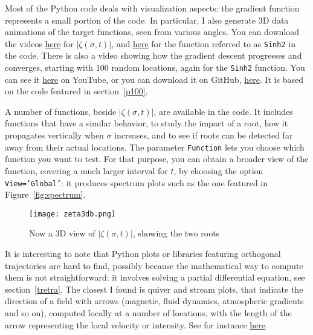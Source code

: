 \documentclass[oneside,10pt]{book}
\begin{document}
Most of the Python code deals with visualization aspects: the gradient function represents a small portion of the code. In particular, I also generate 3D data animations of the target functions, seen from various angles. You can download the videos 
\href{https://github.com/VincentGranville/Experimental-Math-Number-Theory/blob/main/Images/gradient_3D_rotate_zeta.mp4}{here} for $|\zeta(\sigma,t)|$, and \href{https://github.com/VincentGranville/Experimental-Math-Number-Theory/blob/main/Images/gradient_3D_Rotate.mp4}{here} for the function referred to as \texttt{Sinh2} in the code. There is also a video showing how the gradient descent progresses and converges, 
 starting with 100 random locations, again for the \texttt{Sinh2} function. You can see it \href{https://www.youtube.com/watch?v=pqQsLpPkvbw}{here} on YouTube, or you can download it on GitHub, \href{https://github.com/VincentGranville/Experimental-Math-Number-Theory/blob/main/Images/RH4_ortho.mp4}{here}. It is based on the code featured in section~\ref{p100}.

A number of functions, beside $|\zeta(\sigma, t)|$, are available in the code. It includes functions that have a similar behavior, to study the impact of a root, how it propagates vertically when $\sigma$ increases, and to see if roots can be detected far away from their actual locations. The parameter  
 \texttt{Function} lets you choose which function you want to test. For that purpose, you can obtain a broader view of the function, covering a much larger interval for $t$, by choosing the option \texttt{View='Global'}: it produces spectrum plots such as the one featured in
 Figure~\ref{fig:spectrum}.

\begin{figure}%
\centering
\texttt{[image: zeta3db.png]} %
\caption{Now a 3D view of $|\zeta(\sigma,t)|$, showing the two roots}
\label{fig:zeta3d}
\end{figure}
 
It is interesting to note that Python plots or libraries featuring orthogonal trajectories are hard to find, possibly because the mathematical way to compute them is not straightforward: it involves solving a partial differential equation, see section~\ref{tretra}.  The closest I found is quiver and
 stream plots, that indicate the direction of a field with arrows (magnetic, fluid dynamics, atmospheric gradients and so on), computed locally at a number of locations, with the length of the arrow 
 representing the local velocity or intensity. See for instance  
 \href{https://problemsolvingwithpython.com/06-Plotting-with-Matplotlib/06.15-Quiver-and-Stream-Plots/}{here}.
\end{document}
